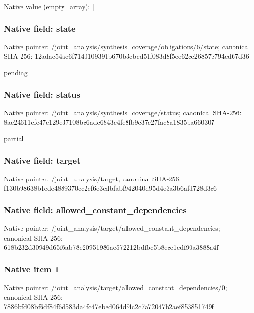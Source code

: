 \documentclass[10pt,a4paper]{article}
\begin{document}
Native value (empty\_\allowbreak{}array): []

\subsubsection{Native field: state}
Native pointer: /joint\_\allowbreak{}analysis/synthesis\_\allowbreak{}coverage/obligations/6/state; canonical SHA-256: 12adac54ac6f7140109391b670b3cbcd51f083d8f5ee62ce26857c794ed67d36

\begingroup\raggedright\sloppy pending\par\endgroup

\subsubsection{Native field: status}
Native pointer: /joint\_\allowbreak{}analysis/synthesis\_\allowbreak{}coverage/status; canonical SHA-256: 8ac24611cfe47c129e37108bc6adc6843c4fe8fb9c37c27fac8a1835ba660307

\begingroup\raggedright\sloppy partial\par\endgroup

\subsubsection{Native field: target}
Native pointer: /joint\_\allowbreak{}analysis/target; canonical SHA-256: f130b98638b1ede4889370cc2cf6e3cdbfabf942040d95d4e3a3b6afd728d3e6

\subsubsection{Native field: allowed\_\allowbreak{}constant\_\allowbreak{}dependencies}
Native pointer: /joint\_\allowbreak{}analysis/target/allowed\_\allowbreak{}constant\_\allowbreak{}dependencies; canonical SHA-256: 618b232d30949d65f6ab78e20951986ae572212bdfbc5b8ece1edf90a3888a4f

\subsubsection{Native item 1}
Native pointer: /joint\_\allowbreak{}analysis/target/allowed\_\allowbreak{}constant\_\allowbreak{}dependencies/0; canonical SHA-256: 7886bfd08bf6df84f6d583da4fc47ebed064df4c2c7a72047b2aef853851749f
\end{document}
